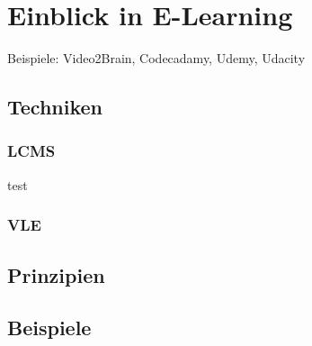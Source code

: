 \chapter{Einblick in E-Learning}
\label{cha:Einblick in E-Learning}
Beispiele: Video2Brain, Codecadamy, Udemy, Udacity

\section{Techniken}
\subsection{LCMS}
test\cite{HICSS:06}

\subsection{VLE}

\section{Prinzipien}

\section{Beispiele}


